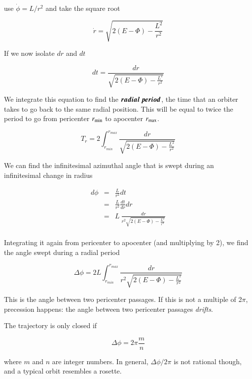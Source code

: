use $\dot\phi = L/r^2$ and take the square root 

\begin{equation}
\dot{r} = \sqrt{2(E-\varPhi) - \frac{L^2}{r^2}}
\end{equation}

If we now isolate $dr$ and $dt$ 

\begin{equation}
dt = \frac{dr}{\sqrt{2(E-\varPhi) - \frac{L^2}{r^2}}}
\end{equation}

We integrate this equation to find the ${\boldsymbol{radial \ period}}$, the time that an orbiter takes to go back to the same radial position. This will be equal to twice the period to go from pericenter $r_{\rm min}$ to apocenter $r_{\rm max}$.

\begin{equation}
\boxed{T_r =  2 \int_{r_{min}}^{r_{max}} \frac{dr}{\sqrt{2(E-\varPhi) - \frac{L^2}{r^2}}}}
\end{equation}

We can find the infinitesimal azimuthal angle that is swept during an infinitesimal change in radius 

\begin{eqnarray}
d\phi &=& \frac{L}{r^2} dt\\
&=& \frac{L}{r^2} \frac{dt}{dr} dr \\
&=& L \ \frac{dr}{r^2\sqrt{2(E-\varPhi) - \frac{L^2}{r^2}}} \\
\end{eqnarray}

Integrating it again from pericenter to apocenter (and multiplying by 2), we find the angle swept during a radial period

\begin{equation}
\boxed{\Delta \phi  = 2L \int_{r_{min}}^{r_{max}}  \frac{dr}{r^2\sqrt{2(E-\varPhi) - \frac{L^2}{r^2}}}}
\end{equation}

This is the angle between two pericenter passages. If this is not a multiple of 2$\pi$, precession happens: the angle between two pericenter passages {\it drifts}. 


The trajectory is only closed if 

\begin{equation}
\Delta \phi = 2\pi\frac{m}{n}
\end{equation}

where $m$ and $n$ are integer numbers. In general, $\Delta \phi/2\pi$ is not rational though, and a typical orbit resembles a rosette. 


